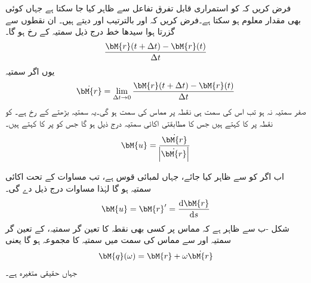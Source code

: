 فرض کریں کہ  کو استمراری قابل تفرق تفاعل  سے ظاہر کیا جا سکتا ہے جہاں  کوئی بھی مقدار معلوم ہو سکتا ہے۔فرض کریں کہ  اور  بالترتیب   اور  دیتے ہیں۔ ان نقطوں سے گزرتا ہوا سیدھا خط  درج ذیل سمتیہ کے رخ ہو گا۔
\begin{align*}
\frac{\bM{r}(t+\Delta t)-\bM{r}(t)}{\Delta t}
\end{align*} 
یوں اگر سمتیہ
\begin{align}
\dot{\bM{r}}=\lim_{\Delta t\to 0} \frac{\bM{r}(t+\Delta t)-\bM{r}(t)}{\Delta t}
\end{align}
صفر سمتیہ نہ ہو تب اس کی سمت ہی نقطہ  پر مماس کی سمت ہو گی۔یہ سمتیہ بڑھتے  کے رخ ہے۔ کو نقطہ  پر  کا  کہتے ہیں جس کا مطابقتی اکائی سمتیہ درج ذیل ہو گا جس کو  پر  کا  کہتے ہیں۔
\begin{align}\label{مساوات_الاحصاء_اکائی_مماس_الف}
\bM{u}=\frac{\dot{\bM{r}}}{\abs{\dot{\bM{r}}}}
\end{align}

اب اگر  کو  سے ظاہر کیا جائے، جہاں  لمبائی قوس ہے، تب مساوات  کے تحت
  اکائی سمتیہ ہو گا لہٰذا مساوات  درج ذیل دے گی۔
\begin{align}\label{مساوات_الاحصاء_اکائی_مماس_ب}
\bM{u}=\bM{r}'=\frac{\dif \bM{r}}{\dif s}
\end{align}
شکل -ب سے ظاہر ہے کہ مماس پر کسی بھی نقطہ  کا تعین گر سمتیہ،   کے تعین گر سمتیہ اور  سے مماس کی سمت میں سمتیہ کا مجموعہ ہو گا یعنی
\begin{align}\label{مساوات_الاحصاء_اکائی_مماس_پ}
\bM{q}(\omega)=\bM{r}+\omega \dot{\bM{r}}
\end{align}  
جہاں  حقیقی متغیرہ ہے۔

